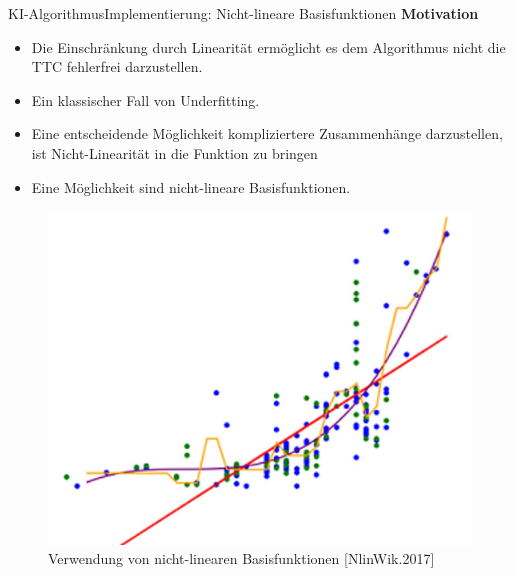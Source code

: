 \documentclass[169, handout	]{THIbeamer} %
\begin{document}
	\begin{frame}{KI-Algorithmus}{Implementierung: Nicht-lineare Basisfunktionen}
		\small		
		\textbf{Motivation}
		\footnotesize
		\begin{itemize}
			\item Die Einschränkung durch Linearität ermöglicht es dem Algorithmus nicht die TTC fehlerfrei darzustellen.
			\item Ein klassischer Fall von Underfitting.
			\item Eine entscheidende Möglichkeit kompliziertere Zusammenhänge darzustellen, ist Nicht-Linearität in die Funktion zu bringen
			\item Eine Möglichkeit sind nicht-lineare Basisfunktionen. 
		\end{itemize}					
		\begin{figure}
			\includegraphics[scale=0.45]{required/Nicht_lineare_Regression.jpg}
			\caption{\scriptsize Verwendung von nicht-linearen Basisfunktionen [NlinWik.2017]}
        	\label{Over and Underfitting}
		\end{figure}
	\end{frame}
\end{document}
